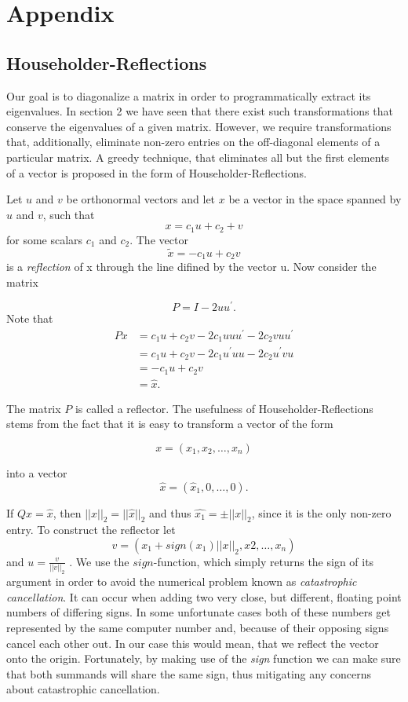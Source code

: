 \documentclass[12pt]{article}
\begin{document}
\newpage
\section{Appendix}
\subsection{Householder-Reflections}

Our goal is to diagonalize a matrix in order to programmatically extract its eigenvalues. In section 2 we have seen that there exist such transformations that conserve the eigenvalues of a given matrix. However, we require transformations that, additionally, eliminate non-zero entries on the off-diagonal elements of a particular matrix. A greedy technique, that eliminates all but the first elements of a vector is proposed in the form of Householder-Reflections.

Let $u$ and $v$ be orthonormal vectors and let $x$ be a vector in the space spanned by $u$ and $v$, such that
$$x = c_1 u + c_2 + v$$
for some scalars $c_1$ and $c_2$. The vector
$$\tilde{x}=-c_1 u + c_2 v$$
is a \textit{reflection} of x through the line difined by the vector u. Now consider the matrix

\begin{equation}
P = I - 2 uu^{\prime}.
\end{equation}
Note that
\begin{align*}
Px &= c_1 u + c_2 v - 2c_1 uuu^{\prime} - 2 c_2 v uu^{\prime} \\
   &= c_1 u + c_2 v - 2c_1 u^{\prime}uu - 2 c_2 u^{\prime} v u \\
   &= -c_1 u + c_2 v\\
   &= \hat{x}.
\end{align*}

The matrix $P$ is called a reflector. The usefulness of Householder-Reflections stems from the fact that it is easy to transform a vector of the form

$$x = (x_1, x_2, \dots, x_n)$$

into a vector
$$\hat{x} = (\hat{x}_1, 0, \dots, 0).$$

If $Qx = \hat{x}$, then $||x||_2 = ||\hat{x}||_2$ and thus $\hat{x_1} = \pm ||x||_2$, since it is the only non-zero entry. To construct the reflector let
\begin{equation}
\label{house-con}
v = (x_1 + sign(x_1)||x||_2, x2, \dots, x_n)
\end{equation}
and $u = \frac{v}{||v||_2}$ \citep{NLA}. We use the $sign$-function, which simply returns the sign of its argument in order to avoid the numerical problem known as \textit{catastrophic cancellation}. It can occur when adding two very close, but different, floating point numbers of differing signs. In some unfortunate cases both of these numbers get represented by the same computer number and, because of their opposing signs cancel each other out. In our case this would mean, that we reflect the vector onto the origin. Fortunately, by making use of the \textit{sign} function we can make sure that both summands will share the same sign, thus mitigating any concerns about catastrophic cancellation.
\end{document}
